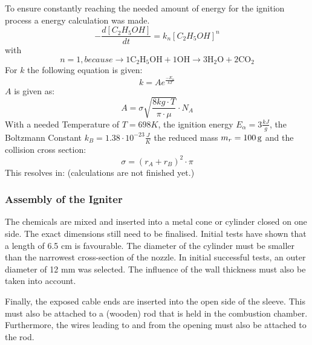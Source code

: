         
        To ensure constantly reaching the needed amount of energy for the ignition process a energy calculation was made. 
        \begin{equation}
            -\frac{d\left[C_{2}H_{5}OH\right]}{dt}=k_{n}\left[C_{2}H_{5}OH\right]^{n}
        \end{equation}
        with
        \begin{equation}
        {n=1,  because}
        \rightarrow 1 \mathrm{C}_2 \mathrm{H}_5 \mathrm{OH}+1 \mathrm{OH} \rightarrow 3 \mathrm{H}_2 \mathrm{O}+2 \mathrm{CO}_2
        \end{equation}
        For $k$ the following equation is given:
        \begin{equation}
        k=A e^{\frac{-E_\alpha}{k T}}
        \end{equation}
        $A$ is given as:
        \begin{equation}
         A = \sigma\sqrt{\frac{8kg\cdot T}{\pi\cdot \mu}} \cdot N_{A}
        \end{equation}
        With a needed Temperature of $T=698 K$, the ignition energy $E_\alpha = 3\frac{kJ}{g}$, the Boltzmann Constant $k_B=1.38 \cdot 10^{-23}\frac{J}{K}$ the reduced mass $m_r = 100 \,\text{g}$ and the collision cross section:
        \begin{equation}
        \sigma=\left(r_A+r_B\right)^2 \cdot \pi 
        \end{equation}
        This resolves in:
        (calculations are not finished yet.)
    \subsubsection{Assembly of the Igniter}

       The chemicals are mixed and inserted into a metal cone or cylinder closed on one side. The exact dimensions still need to be finalised. Initial tests have shown that a length of 6.5 cm is favourable. The diameter of the cylinder must be smaller than the narrowest cross-section of the nozzle. In initial successful tests, an outer diameter of 12 mm was selected. The influence of the wall thickness must also be taken into account. 
       
       Finally, the exposed cable ends are inserted into the open side of the sleeve. This must also be attached to a (wooden) rod that is held in the combustion chamber. Furthermore, the wires leading to and from the opening must also be attached to the rod. \par
        
